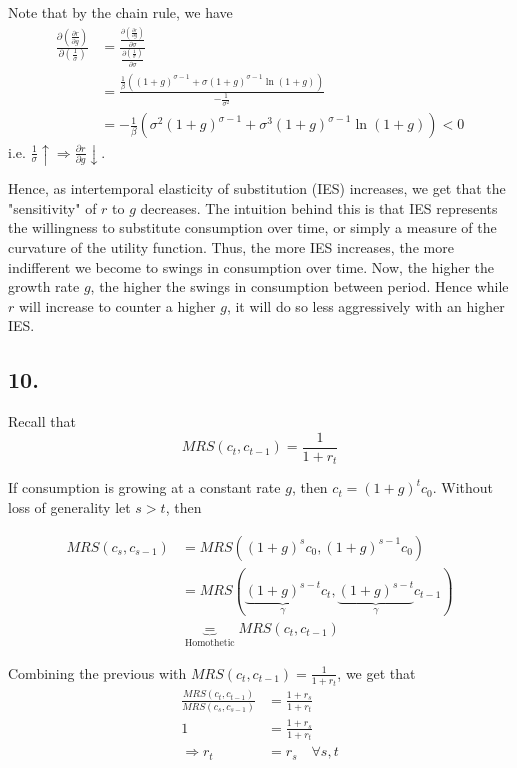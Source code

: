 \documentclass[12pt]{article}
\theoremstyle{definition}
\begin{document}
Note that by the chain rule, we have
\[
\begin{split}
\frac{\partial \left( \frac{\partial r}{\partial g}\right) }{\partial \left( \frac{1}{\sigma}\right) } & = \frac{ \frac{\partial \left(\frac{\partial r}{\partial g}\right) }{\partial \sigma} }{ \frac{\partial\left(  \frac{1}{\sigma}\right) }{\partial \sigma} }\\
& = \frac{\frac{1}{\beta} \left( (1+g)^{\sigma-1} + \sigma(1+g)^{\sigma-1}\ln(1+g) \right) }{-\frac{1}{\sigma^2}}\\
& = - \frac{1}{\beta} \left( \sigma^2(1+g)^{\sigma-1} + \sigma^3(1+g)^{\sigma-1}\ln(1+g) \right)<0
\end{split}
\]
i.e. $\frac{1}{\sigma} \uparrow \Rightarrow \frac{\partial r}{\partial g}  \downarrow$.

Hence, as intertemporal elasticity of substitution (IES) increases, we get that the "sensitivity" of $r$ to $g$ decreases. The intuition behind this is that IES represents the willingness to substitute consumption over time, or simply a measure of the curvature of the utility function. Thus, the more IES increases, the more indifferent we become to swings in consumption over time. Now, the higher the growth rate $g$, the higher the swings in consumption between period. Hence while $r$ will increase to counter a higher $g$, it will do so less aggressively with an higher IES. 

\subsection*{10.}

Recall that
\[
MRS(c_{t},c_{t-1})=\frac{1}{1+r_{t}}
\]

If consumption is growing at a constant rate $g$, then $c_t=(1+g)^tc_0 $. Without loss of generality let $s>t$, then 

\[\begin{split}
MRS(c_{s},c_{s-1}) & = MRS((1+g)^s c_0,(1+g)^{s-1}c_0) \\
&= MRS(\underbrace{(1+g)^{s-t}}_{\gamma}c_t,\underbrace{(1+g)^{s-t}}_{\gamma}c_{t-1}) \\
& \underbrace{=}_{\text{Homothetic}} MRS(c_{t},c_{t-1})
\end{split}
\]

Combining the previous with $MRS(c_{t},c_{t-1})=\frac{1}{1+r_{t}}$, we get that
\[
\begin{split}
\frac{MRS(c_{t},c_{t-1})}{MRS(c_{s},c_{s-1})} & =\frac{1+r_{s}}{1+r_{t}} \\
1 & =\frac{1+r_{s}}{1+r_{t}} \\
\Rightarrow r_t& =r_s \quad \forall s,t
\end{split}
\]
\end{document}
